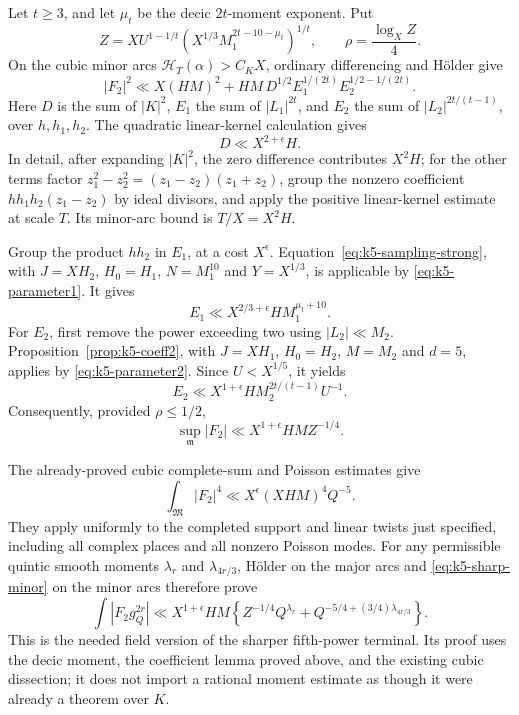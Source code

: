 \documentclass[11pt,reqno]{amsart}
\numberwithin{equation}{section}
\theoremstyle{definition}
\begin{document}
Let $t\ge3$, and let $\mu_t$ be the decic $2t$-moment exponent.  Put
\[
 Z=XU^{1-1/t}\left(X^{1/3}M_1^{2t-10-\mu_t}\right)^{1/t},
 \qquad \rho=\frac{\log_X Z}{4}.
\]
On the cubic minor arcs $\mathcal H_T(\alpha)>C_KX$, ordinary differencing
and H\"older give
\[
 |F_2|^2\ll X(HM)^2+HM\,D^{1/2}E_1^{1/(2t)}E_2^{1/2-1/(2t)}.
\]
Here $D$ is the sum of $|K|^2$, $E_1$ the sum of $|L_1|^{2t}$, and
$E_2$ the sum of $|L_2|^{2t/(t-1)}$, over $h,h_1,h_2$.
The quadratic linear-kernel calculation gives
\[
 D\ll X^{2+\epsilon}H.
\]
In detail, after expanding $|K|^2$, the zero difference contributes $X^2H$;
for the other terms factor $z_1^2-z_2^2=(z_1-z_2)(z_1+z_2)$, group the
nonzero coefficient $hh_1h_2(z_1-z_2)$ by ideal divisors, and apply the
positive linear-kernel estimate at scale $T$.  Its minor-arc bound is
$T/X=X^2H$.

Group the product $hh_2$ in $E_1$, at a cost $X^\epsilon$.
Equation~\eqref{eq:k5-sampling-strong}, with
$J=XH_2$, $H_0=H_1$, $N=M_1^{10}$ and $Y=X^{1/3}$, is applicable by
\eqref{eq:k5-parameter1}.  It gives
\[
 E_1\ll X^{2/3+\epsilon}H M_1^{\mu_t+10}.
\]
For $E_2$, first remove the power exceeding two using $|L_2|\ll M_2$.
Proposition~\ref{prop:k5-coeff2}, with $J=XH_1$, $H_0=H_2$, $M=M_2$ and
$d=5$, applies by \eqref{eq:k5-parameter2}.  Since $U<X^{1/5}$, it yields
\[
 E_2\ll X^{1+\epsilon}H M_2^{2t/(t-1)}U^{-1}.
\]
Consequently, provided $\rho\le1/2$,
\begin{equation}\label{eq:k5-sharp-minor}
 \sup_{\mathfrak m}|F_2|\ll X^{1+\epsilon}HM Z^{-1/4}.
\end{equation}

The already-proved cubic complete-sum and Poisson estimates give
\[
 \int_{\mathfrak M}|F_2|^4\ll X^\epsilon(XHM)^4Q^{-5}.
\]
They apply uniformly to the completed support and linear twists just
specified, including all complex places and all nonzero Poisson modes.
For any permissible quintic smooth moments $\lambda_r$ and
$\lambda_{4r/3}$, H\"older on the major arcs and
\eqref{eq:k5-sharp-minor} on the minor arcs therefore prove
\begin{equation}\label{eq:k5-enhanced-terminal}
 \int|F_2g_Q^{2r}|
 \ll X^{1+\epsilon}HM
 \left\{Z^{-1/4}Q^{\lambda_r}
       +Q^{-5/4+(3/4)\lambda_{4r/3}}\right\}.
\end{equation}
This is the needed field version of the sharper fifth-power terminal.
Its proof uses the decic moment, the coefficient lemma proved above, and
the existing cubic dissection; it does not import a rational moment
estimate as though it were already a theorem over $K$.
\end{document}
